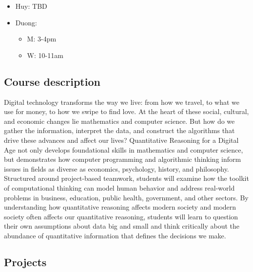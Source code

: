 \documentclass[
]{article}
\providecommand{\tightlist}{%
  \setlength{\itemsep}{0pt}\setlength{\parskip}{0pt}}
\begin{document}
\begin{itemize}
  \begin{itemize}
  \item
    Huy: TBD
  \item
    Duong:

    \begin{itemize}
    \tightlist
    \item
      M: 3-4pm
    \item
      W: 10-11am
    \end{itemize}
  \end{itemize}
\end{itemize}

\hypertarget{course-description}{%
\subsection*{Course description}\label{course-description}}

Digital technology transforms the way we live: from how we travel, to what we use for money, to how we swipe to find love.
At the heart of these social, cultural, and economic changes lie mathematics and computer science. But how do we gather the information, interpret the data, and construct the algorithms that drive these advances and affect our lives? Quantitative Reasoning for a Digital Age not only develops foundational skills in mathematics and computer science, but demonstrates how computer programming and algorithmic thinking inform issues in fields as diverse as economics, psychology, history, and philosophy. Structured around project-based teamwork, students will examine how the toolkit of computational thinking can model human behavior and address real-world problems in business, education, public health, government, and other sectors. By understanding how quantitative reasoning affects modern society and modern society often affects our quantitative reasoning, students will learn to question their own assumptions about data big and small and think critically about the abundance of quantitative information that defines the decisions we make.

\hypertarget{projects}{%
\subsection*{Projects}\label{projects}}
\end{document}
